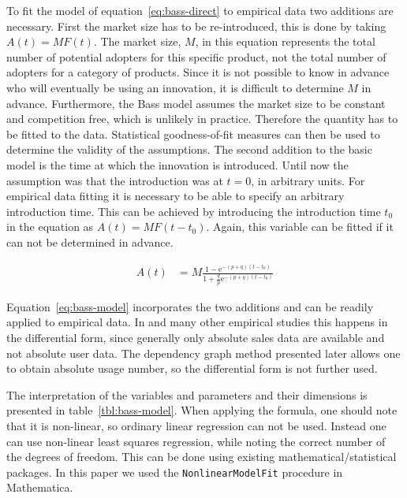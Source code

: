 \documentclass[smallextended,final]{svjour3}
\newcommand{\e}{\mathrm{e}}
\begin{document}
To fit the model of equation~\eqref{eq:bass-direct} to empirical data two additions are necessary. First the market size has to be re-introduced, this is done by taking $A(t) = M F(t)$. The market size, $M$, in this equation represents the total number of potential adopters for this specific product, not the total number of adopters for a category of products. Since it is not possible to know in advance who will eventually be using an innovation, it is difficult to determine $M$ in advance. Furthermore, the Bass model assumes the market size to be constant and competition free, which is unlikely in practice. Therefore the quantity has to be fitted to the data. Statistical goodness-of-fit measures can then be used to determine the validity of the assumptions. The second addition to the basic model is the time at which the innovation is introduced. Until now the assumption was that the introduction was at $t=0$, in arbitrary units. For empirical data fitting it is necessary to be able to specify an arbitrary introduction time. This can be achieved by introducing the introduction time $t_0$ in the equation as $A(t) = M F(t - t_0)$. Again, this variable can be fitted if it can not be determined in advance.

\begin{align} \label{eq:bass-model}
	A(t) &= M \frac{1 - \e^{-(p+q)(t-t_0)}}{1 + \frac{q}{p}\e^{-(p+q)(t-t_0)}}
\end{align}

Equation~\eqref{eq:bass-model} incorporates the two additions and can be readily applied to empirical data. In \citep{mahajan95} and many other empirical studies this happens in the differential form, since generally only absolute sales data are available and not absolute user data. The dependency graph method presented later allows one to obtain absolute usage number, so the differential form is not further used. 

The interpretation of the variables and parameters and their dimensions is presented in table~\ref{tbl:bass-model}. When applying the formula, one should note that it is non-linear, so ordinary linear regression can not be used. Instead one can use non-linear least squares regression, while noting the correct number of the degrees of freedom. This can be done using existing mathematical/statistical packages. In this paper we used the \verb|NonlinearModelFit| procedure in Mathematica. 
\end{document}
